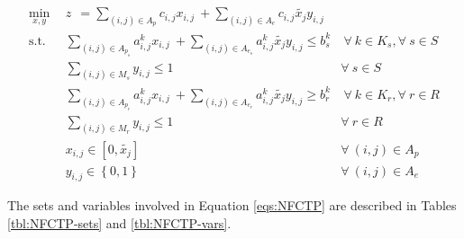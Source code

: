\begin{subequations}\label{eqs:NFCTP}
  \begin{align}
    \min_{x, y} \:\: 
    & 
    z \:\: = 
    \sum_{(i, j) \in A_p} c_{i,j} x_{i,j} 
    \: + 
    \sum_{(i, j) \in A_e} c_{i,j} \tilde{x_j} y_{i,j} 
    & 
    \label{eqs:NFCTP_obj} \\
    \text{s.t.} \:\: 
    &
    \sum_{(i, j) \in A_{p_s}} a^k_{i,j} x_{i,j}
    \: + 
    \sum_{(i, j) \in A_{e_s}} a^k_{i,j} \tilde{x_j} y_{i,j}
    \leq b^k_s 
    &
    \: 
    \forall \: k \in K_s, 
    \forall \: s \in S 
    \label{eqs:NFCTP_sup} \\
    &
    \sum_{(i, j) \in M_{s}} y_{i,j} \leq 1 
    &
    \forall \: s \in S 
    \label{eqs:NFCTP_mut_sup} \\
    &
    \sum_{(i, j) \in A_{p_r}} a^k_{i,j} x_{i,j}
    \: + 
    \sum_{(i, j) \in A_{e_r}} a^k_{i,j} \tilde{x_j} y_{i,j}
    \geq b^k_r 
    &
    \: 
    \forall \: k \in K_r,  
    \forall \: r \in R 
    \label{eqs:NFCTP_req} \\
    &
    \sum_{(i, j) \in M_{r}} y_{i,j} \leq 1 
    &
    \forall \: r \in R 
    \label{eqs:NFCTP_mut_req} \\
    &
    x_{i,j} \in [0, \tilde{x_j}]
    &
    \forall \: (i, j) \in A_p
    \label{eqs:NFCTP_x} \\
    &
    y_{i,j} \in \left\{ 0, 1 \right\}
    &
    \forall \: (i, j) \in A_e
    \label{eqs:NFCTP_y}
  \end{align}
\end{subequations}

The sets and variables involved in Equation \ref{eqs:NFCTP} are described in
Tables \ref{tbl:NFCTP-sets} and \ref{tbl:NFCTP-vars}.

